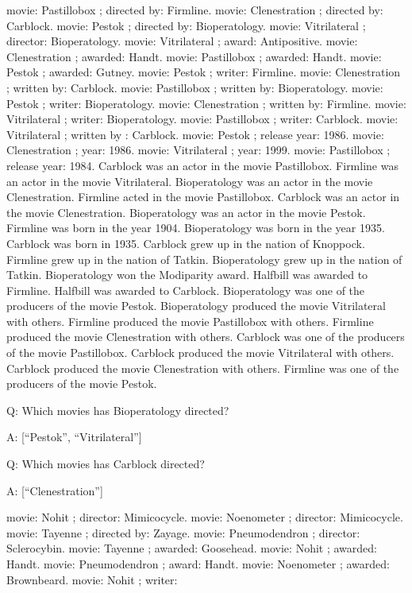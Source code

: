 \documentclass[
]{article}
\begin{document}
movie: Pastillobox ; directed by: Firmline. movie: Clenestration ;
directed by: Carblock. movie: Pestok ; directed by: Bioperatology.
movie: Vitrilateral ; director: Bioperatology. movie: Vitrilateral ;
award: Antipositive. movie: Clenestration ; awarded: Handt. movie:
Pastillobox ; awarded: Handt. movie: Pestok ; awarded: Gutney. movie:
Pestok ; writer: Firmline. movie: Clenestration ; written by: Carblock.
movie: Pastillobox ; written by: Bioperatology. movie: Pestok ; writer:
Bioperatology. movie: Clenestration ; written by: Firmline. movie:
Vitrilateral ; writer: Bioperatology. movie: Pastillobox ; writer:
Carblock. movie: Vitrilateral ; written by : Carblock. movie: Pestok ;
release year: 1986. movie: Clenestration ; year: 1986. movie:
Vitrilateral ; year: 1999. movie: Pastillobox ; release year: 1984.
Carblock was an actor in the movie Pastillobox. Firmline was an actor in
the movie Vitrilateral. Bioperatology was an actor in the movie
Clenestration. Firmline acted in the movie Pastillobox. Carblock was an
actor in the movie Clenestration. Bioperatology was an actor in the
movie Pestok. Firmline was born in the year 1904. Bioperatology was born
in the year 1935. Carblock was born in 1935. Carblock grew up in the
nation of Knoppock. Firmline grew up in the nation of Tatkin.
Bioperatology grew up in the nation of Tatkin. Bioperatology won the
Modiparity award. Halfbill was awarded to Firmline. Halfbill was awarded
to Carblock. Bioperatology was one of the producers of the movie Pestok.
Bioperatology produced the movie Vitrilateral with others. Firmline
produced the movie Pastillobox with others. Firmline produced the movie
Clenestration with others. Carblock was one of the producers of the
movie Pastillobox. Carblock produced the movie Vitrilateral with others.
Carblock produced the movie Clenestration with others. Firmline was one
of the producers of the movie Pestok.

Q: Which movies has Bioperatology directed?

A: {[}``Pestok'', ``Vitrilateral''{]}

Q: Which movies has Carblock directed?

A: {[}``Clenestration''{]}

movie: Nohit ; director: Mimicocycle. movie: Noenometer ; director:
Mimicocycle. movie: Tayenne ; directed by: Zayage. movie: Pneumodendron
; director: Sclerocybin. movie: Tayenne ; awarded: Goosehead. movie:
Nohit ; awarded: Handt. movie: Pneumodendron ; award: Handt. movie:
Noenometer ; awarded: Brownbeard. movie: Nohit ; writer:
\end{document}
